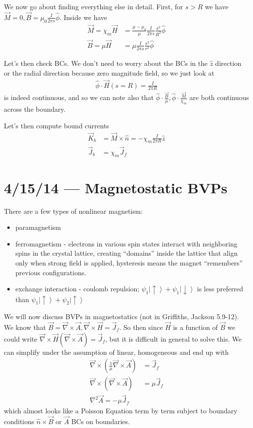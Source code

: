 \documentclass[10pt]{report}
\newcommand{\ket}[1]{\left|#1\right>}
\begin{document}
We now go about finding everything else in detail. First, for $s > R$ we have $\vec{M} = 0, \vec{B} = \mu_0 \frac{I}{2\pi s}\hat{\phi}$. Inside we have 
\begin{align}
    \vec{M} = \chi_m\vec{H} &= \frac{\mu - \mu_0}{\mu}\frac{I}{2\pi s}\frac{s^2}{R^2}\hat{\phi}\\
    \vec{B} = \mu \vec{H} &= \mu \frac{I}{2\pi s}\frac{s^2}{r^2}\hat{\phi}
\end{align}

Let's then check BCs. We don't need to worry about the BCs in the $\hat{z}$ direction or the radial direction because zero magnitude field, so we just look at 
\begin{align}
    \hat{\phi}\cdot \vec{H}(s=R) = \frac{I}{2\pi R}
\end{align}
is indeed continuous, and so we can note also that $\hat{\phi}\cdot \frac{\vec{B}}{\mu}, \hat{\phi}\cdot \frac{\vec{M}}{\chi_m}$ are both continuous across the boundary.

Let's then compute bound currents
\begin{align}
    \vec{K}_b &= \vec{M}\times\hat{n} = -\chi_m \frac{I}{2\pi R}\hat{z}\\
    \vec{J}_b &= \chi_m \vec{J}_f
\end{align}

\chapter{4/15/14 --- Magnetostatic BVPs}

There are a few types of nonlinear magnetism:
\begin{itemize}
    \item paramagnetism
    \item ferromagnetism - electrons in various spin states interact with neighboring spins in the crystal lattice, creating ``domains'' inside the lattice that align only when strong field is applied, hysteresis means the magnet ``remembers'' previous configurations.
    \item exchange interaction - coulomb repulsion; $\psi_1\ket{\uparrow} + \psi_1\ket{\downarrow}$ is less preferred than $\psi_1\ket{\uparrow} + \psi_2\ket{\uparrow}$
\end{itemize}

We will now discuss BVPs in magnetostatics (not in Griffiths, Jackson 5.9-12). We know that $\vec{B} = \vec{\nabla}\times \vec{A}, \vec{\nabla}\times \vec{H} = \vec{J}_f$. So then since $\vec{H}$ is a function of $\vec{B}$ we could write $\vec{\nabla} \times \vec{H}(\vec{\nabla}\times \vec{A}) = \vec{J}_f$, but it is difficult in general to solve this. We can simplify under the assumption of linear, homogeneous and end up with
\begin{align}
    \vec{\nabla} \times \left( \frac{1}{\mu}\vec{\nabla}\times \vec{A} \right) &= \vec{J}_f\\
    \vec{\nabla} \times (\vec{\nabla} \times \vec{A}) &= \mu \vec{J}_f\\
    \nabla^2 \vec{A} = -\mu \vec{J}_f
\end{align}
which almost looks like a Poisson Equation term by term subject to boundary conditions $\hat{n} \times \vec{B}$ or $\vec{A}$ BCs on boundaries.
\end{document}
